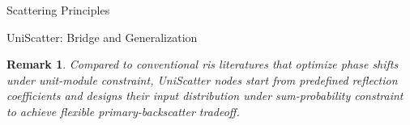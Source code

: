 \documentclass[journal]{IEEEtran}
\newtheorem{remark}{Remark}
\begin{document}
\begin{section}{Scattering Principles}
\begin{subsection}{UniScatter: Bridge and Generalization}
		\begin{remark}
			Compared to conventional \gls{ris} literatures that optimize phase shifts under unit-module constraint, UniScatter nodes start from predefined reflection coefficients and designs their input distribution under sum-probability constraint to achieve flexible primary-backscatter tradeoff.
		\end{remark}
	\end{subsection}
\end{section}
\end{document}
